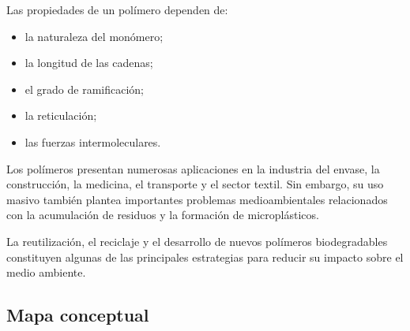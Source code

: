 Las propiedades de un polímero dependen de:

\begin{itemize}

\item la naturaleza del monómero;

\item la longitud de las cadenas;

\item el grado de ramificación;

\item la reticulación;

\item las fuerzas intermoleculares.

\end{itemize}

Los polímeros presentan numerosas aplicaciones en la industria del envase, la
construcción, la medicina, el transporte y el sector textil. Sin embargo, su uso
masivo también plantea importantes problemas medioambientales relacionados con la
acumulación de residuos y la formación de microplásticos.

La reutilización, el reciclaje y el desarrollo de nuevos polímeros biodegradables
constituyen algunas de las principales estrategias para reducir su impacto sobre el
medio ambiente.


\subsection{Mapa conceptual}

\begin{center}


\end{center}

